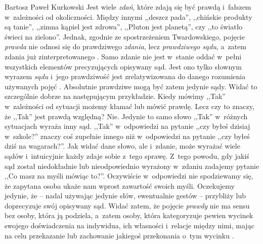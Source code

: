 \begin{artplenv}{Bartosz Paweł Kurkowski}
Jest wiele \textit{zdań}, które zdają się być prawdą i~fałszem w~zależności od okoliczności. Między innymi ,,deszcz
pada'', ,,chińskie produkty są tanie'', ,,zimna kąpiel jest zdrowa'', ,,Pluton jest planetą'', czy ,,to światło świeci na
zielono''. Jednak, zgodnie ze spostrzeżeniem Twardowskiego, pojęcie \textit{prawda }nie odnosi się do prawdziwego
\textit{zdania}, lecz \textit{prawdziwego sądu}, a~zatem zdania już zinterpretowanego
\parencite[por.][s.~27]{grobler_prawda_2000}.
Samo zdanie nie jest w~stanie oddać w~pełni wszystkich elementów precyzujących opisywany sąd.
Jest ono tylko słownym wyrazem \textit{sądu} i~jego prawdziwość jest zrelatywizowana do danego rozumienia używanych
pojęć
\parencite[s.~47]{grobler_prawda_2000}.
Absolutnie prawdziwe mogą być zatem jedynie sądy. Widać to
szczególnie dobrze na następującym przykładzie. Kiedy mówimy ,,Tak'' w~zależności od sytuacji możemy kłamać lub mówić
prawdę. Lecz czy to znaczy, że ,,Tak'' jest prawdą względną? Nie. Jedynie to samo słowo ,,Tak'' w~różnych sytuacjach wyraża
inny sąd. ,,Tak'' w~odpowiedzi na pytanie ,,czy byłeś dzisiaj w~szkole?'' znaczy coś zupełnie innego niż w~odpowiedzi na
pytanie ,,czy byłeś dziś na wagarach?''. Jak widać dane słowo, ale i~zdanie, może wyrażać wiele sądów i~intuicyjnie każdy
zdaje sobie z~tego sprawę. Z~tego powodu, gdy jakiś sąd został niedokładnie lub nieodpowiednio wyrażony w~zdaniu
zadajemy pytanie ,,Co masz na myśli mówiąc to?''. Oczywiście w~odpowiedzi nie spodziewamy się, że zapytana osoba ukaże
nam wprost zawartość swoich myśli. Oczekujemy jedynie, że -- nadal używając jedynie słów, ewentualnie gestów -- przybliży
lub doprecyzuje swój opisywany sąd. Widać zatem, że pojęcie \textit{prawdy }nie ma sensu bez osoby, która ją podziela,
a~zatem osoby, która kategoryzuje pewien wycinek swojego doświadczenia na indywidua, ich własności i~relacje między
nimi, mając na celu przekazanie lub zachowanie jakiegoś przekonania o~tym wycinku
\parencite[s.~79]{grobler_prawda_2000}.



\end{artplenv}
